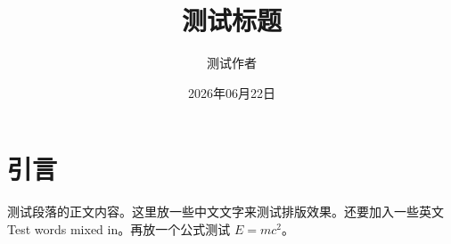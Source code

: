 \documentclass[twocolumn]{harryopo-paper}
\title{测试标题}
\author{测试作者}
\date{2026年06月22日}
\begin{document}
\maketitlewithabstract
\section{引言}
测试段落的正文内容。这里放一些中文文字来测试排版效果。还要加入一些英文Test words mixed in。再放一个公式测试 $E=mc^2$。
\end{document}
